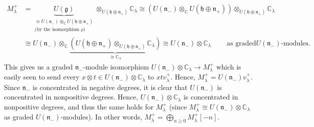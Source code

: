 \documentclass[etingof-lie.tex]{subfiles}
\begin{document}
\begin{align*}
M_{\lambda}^{+}  &  =\underbrace{U\left(  \mathfrak{g}\right)  }%
_{\substack{\cong U\left(  \mathfrak{n}_{-}\right)  \otimes_{\mathbb{C}%
}U\left(  \mathfrak{h}\oplus\mathfrak{n}_{+}\right)  \\\text{(by the
isomorphism }\rho\text{)}}}\otimes_{U\left(  \mathfrak{h}\oplus\mathfrak{n}%
_{+}\right)  }\mathbb{C}_{\lambda}\cong\left(  U\left(  \mathfrak{n}%
_{-}\right)  \otimes_{\mathbb{C}}U\left(  \mathfrak{h}\oplus\mathfrak{n}%
_{+}\right)  \right)  \otimes_{U\left(  \mathfrak{h}\oplus\mathfrak{n}%
_{+}\right)  }\mathbb{C}_{\lambda}\\
&  \cong U\left(  \mathfrak{n}_{-}\right)  \otimes_{\mathbb{C}}%
\underbrace{\left(  U\left(  \mathfrak{h}\oplus\mathfrak{n}_{+}\right)
\otimes_{U\left(  \mathfrak{h}\oplus\mathfrak{n}_{+}\right)  }\mathbb{C}%
_{\lambda}\right)  }_{\cong\mathbb{C}_{\lambda}}\cong U\left(  \mathfrak{n}%
_{-}\right)  \otimes\mathbb{C}_{\lambda}\ \ \ \ \ \ \ \ \ \ \text{as graded
}U\left(  \mathfrak{n}_{-}\right)  \text{-modules.}%
\end{align*}
This gives us a graded $\mathfrak{n}_{-}$-module isomorphism $U\left(
\mathfrak{n}_{-}\right)  \otimes\mathbb{C}_{\lambda}\rightarrow M_{\lambda
}^{+}$ which is easily seen to send every $x\otimes t\in U\left(
\mathfrak{n}_{-}\right)  \otimes\mathbb{C}_{\lambda}$ to $xtv_{\lambda}^{+}$.
Hence, $M_{\lambda}^{+}=U\left(  \mathfrak{n}_{-}\right)  v_{\lambda}^{+}$.
Since $\mathfrak{n}_{-}$ is concentrated in negative degrees, it is clear that
$U\left(  \mathfrak{n}_{-}\right)  $ is concentrated in nonpositive degrees.
Hence, $U\left(  \mathfrak{n}_{-}\right)  \otimes\mathbb{C}_{\lambda}$ is
concentrated in nonpositive degrees, and thus the same holds for $M_{\lambda
}^{+}$ (since $M_{\lambda}^{+}\cong U\left(  \mathfrak{n}_{-}\right)
\otimes\mathbb{C}_{\lambda}$ as graded $U\left(  \mathfrak{n}_{-}\right)
$-modules). In other words, $M_{\lambda}^{+}=\bigoplus\limits_{n\geq
0}M_{\lambda}^{+}\left[  -n\right]  $.
\end{document}
